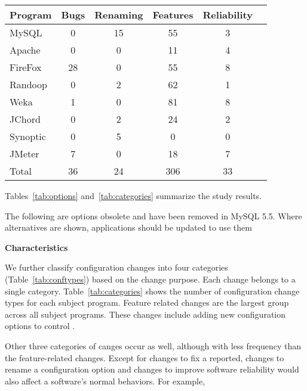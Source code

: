\begin{table}[t]
\vspace{1mm}
\centering
\small{
\setlength{\tabcolsep}{.50\tabcolsep}
\begin{tabular}{|l||c|c|c|c|c|}
\hline
 Program & Bugs & Renaming & Features & Reliability \\
 \hline
 \hline
 MySQL & 0 & 15 & 55 & 3 \\
 Apache& 0 & 0 & 11 & 4 \\
 FireFox& 28 & 0 & 55 & 8 \\
 Randoop & 0  & 2 & 62  & 1\\
 Weka & 1  & 0 & 81  & 8 \\
 JChord & 0  & 2 & 24 & 2\\ %
 Synoptic & 0 &  5 & 0 & 0\\
 JMeter & 7  & 0 & 18 & 7 \\
\hline
\hline
 Total & 36 & 24 & 306 & 33 \\
\hline
\end{tabular}
}
\vspace{-2mm}
\end{table}

Tables~\ref{tab:options} and~\ref{tab:categories}
summarize the study results.

The following are options obsolete and have been removed in
MySQL 5.5. Where alternatives are shown, applications should
be updated to use them

\vspace{1mm}
\noindent\textbf{Characteristics}


We further classify configuration changes into
four categories (Table~\ref{tab:conftypes}) based
on the change purpose. Each change belongs to a single category.
Table~\ref{tab:categories} shows the number of
configuration change types for each subject program.
Feature related changes are the largest group across
all subject programs. These changes include
adding new configuration options to control .

Other three categories of canges occur as well, although
with less frequency than the feature-related changes.
Except for changes to fix a reported, changes to rename
a configuration option and changes to improve
software reliability would also affect a
software's normal behaviors. For example,



